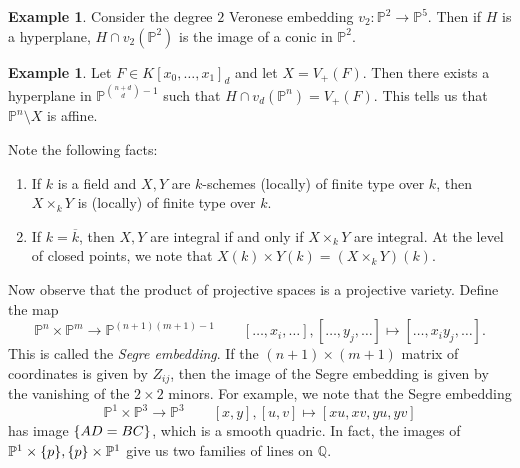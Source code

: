 \documentclass[leqno, openany]{memoir}
\theoremstyle{definition}
\newtheorem{exm}[thm]{Example}
\theoremstyle{remark}
\theoremstyle{plain}
\theoremstyle{definition}
\theoremstyle{remark}
\newcommand{\Q}{\mathbb{Q}}
\renewcommand{\P}{\mathbb{P}}
\newcommand{\ol}[1]{\overline{#1}}
\begin{document}
\begin{exm}
    Consider the degree $2$ Veronese embedding $v_2 \colon \P^2 \to \P^5$. Then if $H$ is a hyperplane, $H \cap v_2(\P^2)$ is the image of a conic in $\P^2$.
\end{exm}

\begin{exm}
    Let $F \in {K[x_0, \ldots, x_1]}_d$ and let $X = V_+(F)$. Then there exists a hyperplane in $\P^{\binom{n+d}{d}-1}$ such that $H \cap v_d(\P^n) = V_+(F)$. This tells us that $\P^n \setminus X$ is affine.
\end{exm}

Note the following facts:
\begin{enumerate}
    \item If $k$ is a field and $X,Y$ are $k$-schemes (locally) of finite type over $k$, then $X \times_k Y$ is (locally) of finite type over $k$.
    \item If $k = \ol{k}$, then $X,Y$ are integral if and only if $X \times_k Y$ are integral. At the level of closed points, we note that $X(k) \times Y(k) = (X \times_k Y)(k)$.
\end{enumerate}

Now observe that the product of projective spaces is a projective variety. Define the map
\[ \P^n \times \P^m \to \P^{(n+1)(m+1)-1} \qquad [\ldots, x_i,\ldots], [\ldots, y_j, \ldots] \mapsto [\ldots, x_i y_j, \ldots]. \]
This is called the \textit{Segre embedding}. If the $(n+1) \times (m+1)$ matrix of coordinates is given by $Z_{ij}$, then the image of the Segre embedding is given by the vanishing of the $2 \times 2$ minors. For example, we note that the Segre embedding
\[ \P^1 \times \P^3 \to \P^3 \qquad [x,y], [u,v] \mapsto [xu,xv,yu,yv] \]
has image $\qty{AD = BC}$, which is a smooth quadric. In fact, the images of $\P^1 \times \qty{p}, \qty{p} \times \P^1$ give us two families of lines on $\Q$.
\end{document}
